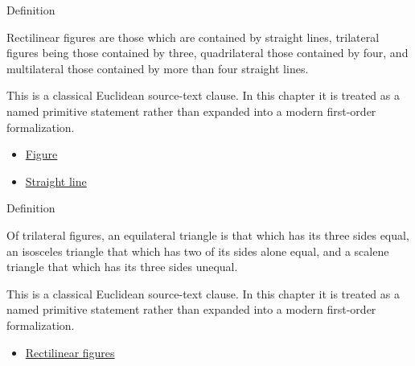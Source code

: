 \begin{definitionbox}{Definition}
\begin{definition}
\label{def:euclid-rectilinear-figures}
Rectilinear figures are those which are contained by straight lines, trilateral
figures being those contained by three, quadrilateral those contained by four,
and multilateral those contained by more than four straight lines.
\end{definition}
\end{definitionbox}
\begin{remark*}
This is a classical Euclidean source-text clause. In this chapter it is treated
as a named primitive statement rather than expanded into a modern first-order
formalization.
\end{remark*}

\begin{lra-not-visible}
\begin{dependencies}
\begin{itemize}
  \item \hyperref[def:euclid-figure]{Figure}
  \item \hyperref[def:euclid-straight-line]{Straight line}
\end{itemize}
\end{dependencies}
\end{lra-not-visible}

\begin{definitionbox}{Definition}
\begin{definition}
\label{def:euclid-triangle-side-classes}
Of trilateral figures, an equilateral triangle is that which has its three
sides equal, an isosceles triangle that which has two of its sides alone equal,
and a scalene triangle that which has its three sides unequal.
\end{definition}
\end{definitionbox}
\begin{remark*}
This is a classical Euclidean source-text clause. In this chapter it is treated
as a named primitive statement rather than expanded into a modern first-order
formalization.
\end{remark*}

\begin{lra-not-visible}
\begin{dependencies}
\begin{itemize}
  \item \hyperref[def:euclid-rectilinear-figures]{Rectilinear figures}
\end{itemize}
\end{dependencies}
\end{lra-not-visible}

